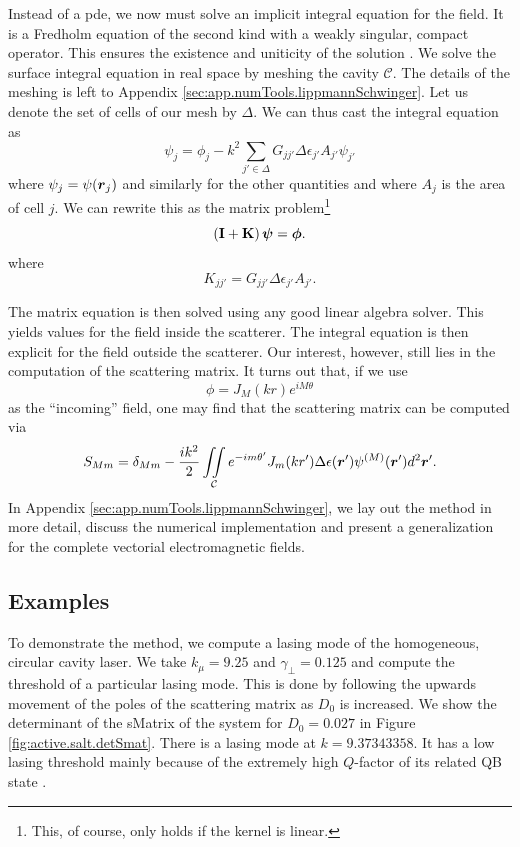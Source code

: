 Instead of a \gls{pde}, we now must solve an implicit 
integral equation for the field. It is a Fredholm 
equation of the second kind with a weakly singular, compact
operator. This ensures the existence
and uniticity of the solution \cite{GOH1981,COL2013}.
We solve the surface integral equation in real space by meshing
the cavity $\mathcal{C}$. The details of the meshing is left to 
Appendix \ref{sec:app.numTools.lippmannSchwinger}. Let us denote the set
of cells of our mesh by $\Delta$. We can thus cast the integral
equation as
	\begin{equation}
		\psi_j = \phi_j -k^2\sum_{j'\in\Delta} G_{jj'}\Delta\epsilon_{j'}A_{j'}\psi_{j'}
	\end{equation}
where $\psi_j=\psi(\boldsymbol{r}_j)$ and similarly for the other quantities and 
where $A_j$ is the area of cell $j$.  We can
rewrite this as the matrix problem\footnote{This, of course, only holds if the
kernel is linear.} 
	\begin{equation}
		\left(\mathbf{I}+\mathbf{K}\right)\boldsymbol{\psi}=\boldsymbol{\phi}.
	\end{equation}
where 
	\begin{equation}
		K_{jj'} = G_{jj'}\Delta\epsilon_{j'}A_{j'}.
	\end{equation}

The matrix equation is then solved using any good 
linear algebra solver. This yields values for the
field inside the scatterer. The integral equation
is then explicit for the field outside the scatterer. 
Our interest, however, still lies in the computation
of the scattering matrix. It turns out that, if we
use 
	\begin{equation}
		\phi = J_M(kr)e^{iM\theta}
	\end{equation}
as the ``incoming'' field, one may find that the scattering
matrix can be computed via
	\begin{equation}
		S_{Mm} = \delta_{Mm} - \frac{ik^2}{2}\mathop{\iint}_\mathcal{C}e^{-im{\theta'}}J_m(kr')\Delta\epsilon(\boldsymbol{r}')\psi^{(M)}(\boldsymbol{r}')d^2\boldsymbol{r}'.
	\end{equation}
In Appendix \ref{sec:app.numTools.lippmannSchwinger}, we lay out the method in more detail, 
discuss the numerical implementation and present a generalization for the complete 
vectorial electromagnetic fields.

\subsection{Examples}
To demonstrate the method, we compute a lasing mode
of the homogeneous, circular cavity laser. We take $k_\mu=9.25$
and $\gamma_\perp=0.125$ and compute the threshold of a particular
lasing mode. This is done by following the upwards movement 
of the poles of the scattering matrix as $D_0$ is increased.
We show the determinant of the \gls{sMatrix} of the system 
for $D_0=0.027$ in Figure \ref{fig:active.salt.detSmat}.
There is a lasing mode at $k=9.37343358$. It has a low lasing threshold mainly 
because of the extremely high $Q$-factor of its related QB state \cite{GAG2014a}. 

